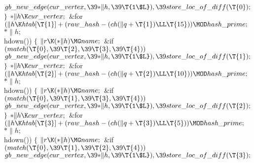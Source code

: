 ${}\\{gb\_new\_edge}(\\{cur\_vertex},\39{*}\|h,\39\T{1\$L}),\39\\{store\_loc%
\_of\_diff}(\T{0});{}$\2\6
\4${}\}{}$\2\6
${}{*}\|h\K\\{cur\_vertex};{}$\6
\&{for} ${}(\|h\K\\{htab}[\T{1}]+(\\{raw\_hash}-(\\{ch}(\|q+\T{1})\LL\T{15}))%
\MOD\\{hash\_prime};{}$ ${}{*}\|h;{}$ \\{hdown}())\5
${}\{{}$\1\6
${}\|r\K({*}\|h)\MG\\{name};{}$\6
\&{if} ${}(\\{match}(\T{0},\39\T{2},\39\T{3},\39\T{4})){}$\1\5
${}\\{gb\_new\_edge}(\\{cur\_vertex},\39{*}\|h,\39\T{1\$L}),\39\\{store\_loc%
\_of\_diff}(\T{1});{}$\2\6
\4${}\}{}$\2\6
${}{*}\|h\K\\{cur\_vertex};{}$\6
\&{for} ${}(\|h\K\\{htab}[\T{2}]+(\\{raw\_hash}-(\\{ch}(\|q+\T{2})\LL\T{10}))%
\MOD\\{hash\_prime};{}$ ${}{*}\|h;{}$ \\{hdown}())\5
${}\{{}$\1\6
${}\|r\K({*}\|h)\MG\\{name};{}$\6
\&{if} ${}(\\{match}(\T{0},\39\T{1},\39\T{3},\39\T{4})){}$\1\5
${}\\{gb\_new\_edge}(\\{cur\_vertex},\39{*}\|h,\39\T{1\$L}),\39\\{store\_loc%
\_of\_diff}(\T{2});{}$\2\6
\4${}\}{}$\2\6
${}{*}\|h\K\\{cur\_vertex};{}$\6
\&{for} ${}(\|h\K\\{htab}[\T{3}]+(\\{raw\_hash}-(\\{ch}(\|q+\T{3})\LL\T{5}))%
\MOD\\{hash\_prime};{}$ ${}{*}\|h;{}$ \\{hdown}())\5
${}\{{}$\1\6
${}\|r\K({*}\|h)\MG\\{name};{}$\6
\&{if} ${}(\\{match}(\T{0},\39\T{1},\39\T{2},\39\T{4})){}$\1\5
${}\\{gb\_new\_edge}(\\{cur\_vertex},\39{*}\|h,\39\T{1\$L}),\39\\{store\_loc%
\_of\_diff}(\T{3});{}$\2\6
